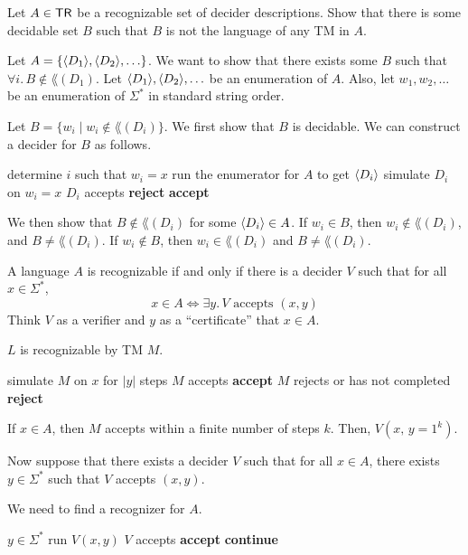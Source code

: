Let $A \in \mathsf{TR}$ be a recognizable set of decider descriptions. Show that there is some decidable set $B$ such that $B$ is not the language of any TM in $A$.

Let $A = \{\langle D_1 \rangle,\langle D_2 \rangle,\ldots\}$. We want to show that there exists some $B$ such that $\forall i.\, B \not \in \lang(D_1)$. Let $\langle D_1 \rangle,\langle D_2 \rangle,\ldots$ be an enumeration of $A$. Also, let $w_1,w_2,\ldots$ be an enumeration of $\Sigma^*$ in standard string order.

Let $B = \{ w_i \mid w_i \not\in \lang(D_i) \}$. We first show that $B$ is decidable. We can construct a decider for $B$ as follows.
\begin{codebox}
    \li determine $i$ such that $w_i = x$
    \li run the enumerator for $A$ to get $\langle D_i \rangle$ 
    \li simulate $D_i$ on $w_i = x$ 
    \li \If $D_i$ accepts \Then
        \li \textbf{reject}
    \li \Else
        \li \textbf{accept}
\end{codebox}

We then show that $B \not\in \lang(D_i)$ for some $\langle D_i \rangle \in A$. If $w_i \in B$, then $w_i \not\in \lang(D_i)$, and $B \neq\lang(D_i)$. If $w_i \not\in B$, then $w_i \in \lang(D_i)$ and $B \neq \lang(D_i)$.

A language $A$ is recognizable if and only if there is a decider $V$ such that for all $x \in \Sigma^*$,
$$
x \in A \iff \exists y.\, \text{$V$ accepts $(x,y)$}
$$
Think $V$ as a verifier and $y$ as a ``certificate'' that $x \in A$.

$L$ is recognizable by TM $M$.
\begin{codebox}
    \li simulate $M$ on $x$ for $|y|$ steps
    \li \If $M$ accepts \Then
        \li \textbf{accept}
    \li \ElseIf $M$ rejects or has not completed \Then
        \li \textbf{reject}
    \End
\end{codebox}
If $x \in A$, then $M$ accepts within a finite number of steps $k$. Then, $V(x,\, y=1^k)$.

Now suppose that there exists a decider $V$ such that for all $x \in A$, there exists $y \in \Sigma^*$ such that $V$ accepts $(x,y)$.

We need to find a recognizer for $A$.

\begin{codebox}
    \li \For $y \in \Sigma^*$ \Do
        \li run $V(x,y)$ 
        \li \If $V$ accepts \Then
            \li \textbf{accept}
        \li \Else
            \li \textbf{continue}
\end{codebox}

